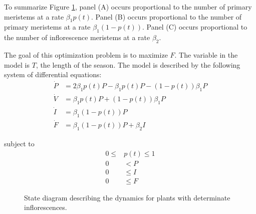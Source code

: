 \documentclass[12pt, oneside]{article}   	%
\begin{document}
To summarize Figure \ref{fig:state-determinate}, panel (A) occurs proportional to the number of primary meristems at a rate $\beta_1 p(t)$. Panel (B) occurs proportional to the number of primary meristems at a rate $\beta_1 (1-p(t))$. Panel (C) occurs proportional to the number of inflorescence meristems at a rate $\beta_2$.

The goal of this optimization problem is to maximize $F$. The variable in the model is $T$, the length of the season. The model is described by the following system of differential equations:
%
\begin{align}
\dot{P} & = 2 \beta_1 p(t) P - \beta_1 p(t) P - ( 1-p(t) ) \beta_1 P \nonumber \\
\dot{V} & = \beta_1 p(t) P + ( 1-p(t) ) \beta_1 P \nonumber \\
\dot{I} & = \beta_1 ( 1-p(t) ) P \nonumber \\ %
\dot{F} & = \beta_1 ( 1-p(t) ) P + \beta_2 I
\label{eqn:de-determinate}
\end{align}

\noindent subject to
%
\begin{align}
0 \leq & p(t) \leq 1 \nonumber \\
0 & < P \nonumber \\
0 & \leq I \nonumber \\
0 & \leq F
\label{eqn:constraints-determinate}
\end{align}

\begin{figure}[hbt!]
\centering
{}
  \caption{State diagram describing the dynamics for plants with determinate inflorescences.}
  \label{fig:state-determinate}
\end{figure}
\end{document}
